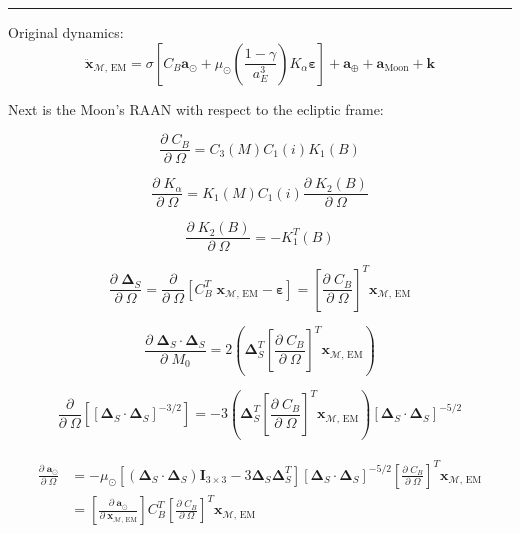 \documentclass[]{article}
\newcommand{\pd}[2]{\frac{\partial\;#1}{\partial\;#2}}
\newcommand{\pddown}[2]{\frac{\partial}{\partial\;#2} \left[ #1 \right] }
\begin{document}
	\hrule \vspace{1em}
	Original dynamics: 
	\begin{equation}
		\ddot{\mathbf{x}}_{\mathcal{M}\text{, EM}} = \sigma \left[ C_B  \mathbf{a}_{\odot} + \mu_\odot \left(\frac{1-\gamma}{a_E^3}\right) K_\alpha \boldsymbol{\varepsilon} \right] + \mathbf{a}_\oplus +  \mathbf{a}_\text{Moon}  + \mathbf{k}
	\end{equation}
	
	Next is the Moon's RAAN with respect to the ecliptic frame:
	
	\begin{equation*}
		\pd{C_B}{\Omega} = C_3(M) C_1(i) K_1(B)
	\end{equation*}
	
	\begin{equation*}
		\pd{K_\alpha}{\Omega} = K_1(M) C_1(i) \pd{K_2(B)}{\Omega}
	\end{equation*}
	
	\begin{equation*}
		\pd{K_2(B)}{\Omega} = -K_1^T(B)
	\end{equation*}
	
	\begin{equation*}
		\pd{\boldsymbol{\Delta}_S}{\Omega} = \pddown{C_B^T \; \mathbf{x}_{\mathcal{M}\text{, EM}} - \boldsymbol{\varepsilon}}{\Omega} = \left[ \pd{C_B}{\Omega} \right]^T \mathbf{x}_{\mathcal{M}\text{, EM}}
	\end{equation*}
	
	\begin{equation*}
		\pd{\boldsymbol{\Delta}_S \cdot \boldsymbol{\Delta}_S}{M_0} = 2\left( \boldsymbol{\Delta}_S^T \left[ \pd{C_B}{\Omega} \right]^T \mathbf{x}_{\mathcal{M}\text{, EM}} \right)
	\end{equation*}
	
	\begin{equation*}
		\pddown{ [\boldsymbol{\Delta}_S \cdot \boldsymbol{\Delta}_S]^{-3/2} }{\Omega} = -3 \left( \boldsymbol{\Delta}_S^T \left[ \pd{C_B}{\Omega} \right]^T \mathbf{x}_{\mathcal{M}\text{, EM}} \right) [\boldsymbol{\Delta}_S \cdot \boldsymbol{\Delta}_S]^{-5/2}
	\end{equation*}
	
	\begin{align}
	\begin{split}
		\pd{\mathbf{a}_{\odot}}{\Omega}
		&= -\mu_\odot \left[ (\boldsymbol{\Delta}_S \cdot \boldsymbol{\Delta}_S)\mathbf{I}_{3\times 3} - 3 \boldsymbol{\Delta}_S \boldsymbol{\Delta}_S^T \right] [\boldsymbol{\Delta}_S \cdot \boldsymbol{\Delta}_S]^{-5/2} \left[ \pd{C_B}{\Omega} \right]^T \mathbf{x}_{\mathcal{M}\text{, EM}} \\
		&= \left[\pd{\mathbf{a}_{\odot}}{ \mathbf{x}_{\mathcal{M}\text{, EM}} }\right] C_B^T \left[ \pd{C_B}{\Omega} \right]^T \mathbf{x}_{\mathcal{M}\text{, EM}}
	\end{split}
	\end{align}
	
\end{document}
